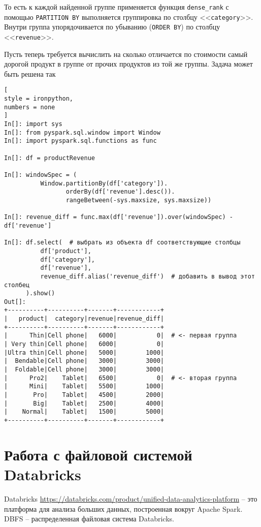 \documentclass[%
	11pt,
	a4paper,
	utf8,
		]{article}
\begin{document}
То есть к каждой найденной группе применяется функция \texttt{dense\_rank} с помощью \texttt{PARTITION BY} выполняется группировка по столбцу <<\texttt{category}>>. Внутри группа упорядочивается по убыванию (\texttt{ORDER BY}) по столбцу <<\texttt{revenue}>>.

Пусть теперь требуется вычислить на сколько отличается по стоимости самый дорогой продукт в группе от прочих продуктов из той же группы. Задача может быть решена так

\begin{lstlisting}[
style = ironpython,
numbers = none
]
In[]: import sys
In[]: from pyspark.sql.window import Window
In[]: import pyspark.sql.functions as func

In[]: df = productRevenue

In[]: windowSpec = (
          Window.partitionBy(df['category']).
                 orderBy(df['revenue'].desc()).
                 rangeBetween(-sys.maxsize, sys.maxsize))
                 
In[]: revenue_diff = func.max(df['revenue']).over(windowSpec) - df['revenue']

In[]: df.select(  # выбрать из объекта df соответствующие столбцы
          df['product'],
          df['category'],
          df['revenue'],
          revenue_diff.alias('revenue_diff')  # добавить в вывод этот столбец
      ).show()
Out[]:
+----------+----------+-------+------------+
|   product|  category|revenue|revenue_diff|
+----------+----------+-------+------------+
|      Thin|Cell phone|   6000|           0|  # <- первая группа
| Very thin|Cell phone|   6000|           0|
|Ultra thin|Cell phone|   5000|        1000|
|  Bendable|Cell phone|   3000|        3000|
|  Foldable|Cell phone|   3000|        3000|
|      Pro2|    Tablet|   6500|           0|  # <- вторая группа
|      Mini|    Tablet|   5500|        1000|
|       Pro|    Tablet|   4500|        2000|
|       Big|    Tablet|   2500|        4000|
|    Normal|    Tablet|   1500|        5000|
+----------+----------+-------+------------+
\end{lstlisting}

\section{Работа с файловой системой Databricks}

Databricks \url{https://databricks.com/product/unified-data-analytics-platform} -- это платформа для анализа больших данных, построенная вокруг Apache Spark. DBFS -- распределенная файловая система Databricks.
\end{document}
